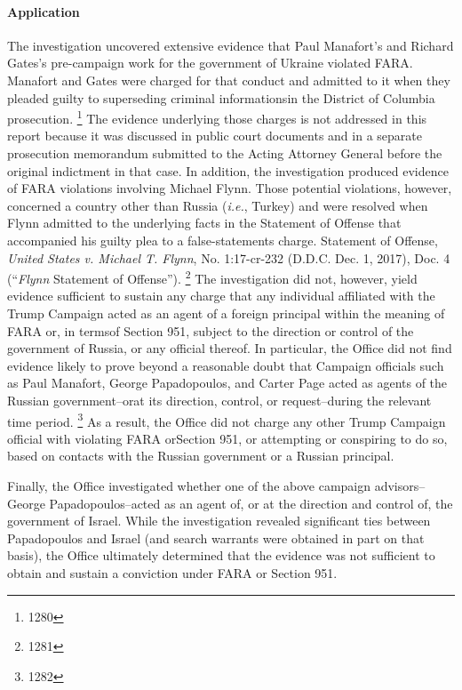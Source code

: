 \paragraph{Application}
The investigation uncovered extensive evidence that Paul Manafort's and Richard Gates's pre-campaign work for the government of Ukraine violated FARA. 
Manafort and Gates were charged for that conduct and admitted to it when they pleaded guilty to superseding criminal informationsin the District of Columbia prosecution.%
\footnote{1280}
The evidence underlying those charges is not addressed in this report because it was discussed in public court documents and in a separate prosecution memorandum submitted to the Acting Attorney General before the original indictment in that case.
In addition, the investigation produced evidence of FARA violations involving Michael Flynn. 
Those potential violations, however, concerned a country other than Russia (\textit{i.e.}, Turkey) and were resolved when Flynn admitted to the underlying facts in the Statement of Offense that accompanied his guilty plea to a false-statements charge. 
Statement of Offense, \textit{United States v. Michael T. Flynn}, No. 1:17-cr-232 (D.D.C. Dec. 1, 2017), Doc. 4 (``\textit{Flynn} Statement of Offense'').%
\footnote{1281}
The investigation did not, however, yield evidence sufficient to sustain any charge that any individual affiliated with the Trump Campaign acted as an agent of a foreign principal within the meaning of FARA or, in termsof Section 951, subject to the direction or control of the government of Russia, or any official thereof. 
In particular, the Office did not find evidence likely to prove beyond a reasonable doubt that Campaign officials such as Paul Manafort, George Papadopoulos, and Carter Page acted as agents of the Russian government--orat its direction, control, or request--during the relevant time period.%
\footnote{1282}
As a result, the Office did not charge  any other Trump Campaign official with violating FARA orSection 951, or attempting or conspiring to do so, based on contacts with the Russian government or a Russian principal.

Finally, the Office investigated whether one of the above campaign advisors--George Papadopoulos--acted as an agent of, or at the direction and control of, the government of Israel.
While the investigation revealed significant ties between Papadopoulos and Israel (and search warrants were obtained in part on that basis), the Office ultimately determined that the evidence was not sufficient to obtain and sustain a conviction under FARA or Section 951.

